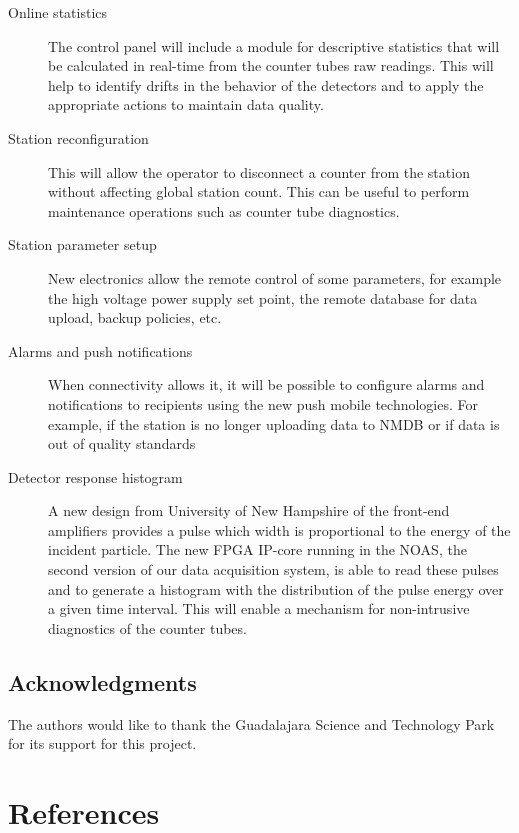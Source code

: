 \documentclass[a4paper]{jpconf}
\begin{document}
\begin{description}
    \item[Online statistics] The control panel will include a module for
        descriptive statistics that will be calculated in real-time from the
        counter tubes raw readings. This will help to identify drifts in the
        behavior of the detectors and to apply the appropriate actions to
        maintain data quality.
    \item[Station reconfiguration] This will allow the operator to disconnect a
        counter from the station without affecting global station count. This
        can be useful to perform maintenance operations such as counter tube
        diagnostics. 
    \item[Station parameter setup] New electronics allow the remote control of
        some parameters, for example the high voltage power supply set point,
        the remote database for data upload, backup policies, etc.
    \item[Alarms and push notifications] When connectivity allows it, it will
        be possible to configure alarms and notifications to recipients using
        the new push mobile technologies. For example, if the station is no
        longer uploading data to NMDB or if data is out of quality standards
    \item[Detector response histogram] A new design from University of New
      	Hampshire of the front-end amplifiers provides a pulse which
        width is proportional to the energy of the incident particle. The new
        FPGA IP-core running in the NOAS, the second version of our data
        acquisition system, is able to read these pulses and to generate a
        histogram with the distribution of the pulse energy over a given time
        interval. This will enable a mechanism for non-intrusive diagnostics of
        the counter tubes. 
\end{description}


\subsection*{Acknowledgments} 

The authors would like to thank the Guadalajara Science and Technology Park for
its support for this project.


\section*{References}
 
\end{document}
